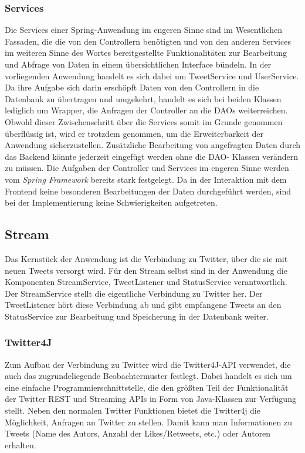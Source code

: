 \subsubsection*{Services}
Die Services einer Spring-Anwendung im engeren Sinne sind im Wesentlichen Fassaden, die die von den 
Controllern benötigten und von den anderen Services im weiteren Sinne des Wortes bereitgestellte 
Funktionalitäten zur Bearbeitung und Abfrage von Daten in einem übersichtlichen Interface bündeln. 
In der vorliegenden Anwendung handelt es sich dabei um TweetService und UserService. Da ihre Aufgabe 
sich darin erschöpft Daten von den Controllern in die Datenbank zu übertragen und umgekehrt, handelt 
es sich bei beiden Klassen lediglich um Wrapper, die Anfragen der Controller an die DAOs 
weiterreichen. Obwohl dieser Zwischenschritt über die Services somit im Grunde genommen überflüssig 
ist, wird er trotzdem genommen, um die Erweiterbarkeit der Anwendung sicherzustellen. Zusätzliche 
Bearbeitung von angefragten Daten durch das Backend könnte jederzeit eingefügt werden ohne die DAO-
Klassen verändern zu müssen.
\newpage
Die Aufgaben der Controller und Services im engeren Sinne werden vom \textit{Spring Framework} 
bereits stark festgelegt. Da in der Interaktion mit dem Frontend keine besonderen Bearbeitungen der 
Daten durchgeführt werden, sind bei der Implementierung keine Schwierigkeiten aufgetreten.

\subsection{Stream}
Das Kernstück der Anwendung ist die Verbindung zu Twitter, über die sie mit neuen Tweets versorgt wird. 
Für den Stream selbst sind in der Anwendung die Komponenten StreamService, TweetListener und 
StatusService verantwortlich. Der StreamService stellt die eigentliche Verbindung zu Twitter her. Der 
TweetListener hört diese Verbindung ab und gibt empfangene Tweets an den StatusService zur Bearbeitung 
und Speicherung in der Datenbank weiter.

\subsubsection*{Twitter4J}
Zum Aufbau der Verbindung zu Twitter wird die Twitter4J-API verwendet, die auch das zugrundeliegende 
Beobachtermuster festlegt. Dabei handelt es sich um eine einfache Programmierschnittstelle, die den 
größten Teil der Funktionalität der Twitter REST und Streaming APIs in Form von Java-Klassen zur 
Verfügung stellt. Neben den normalen Twitter Funktionen bietet die Twitter4j die Möglichkeit,
Anfragen an Twitter zu stellen. Damit kann man Informationen zu Tweets (Name des Autors,
Anzahl der Likes/Retweets, etc.) oder Autoren erhalten.

